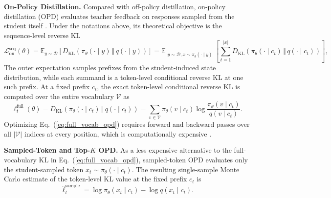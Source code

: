 \documentclass{article} %
\begin{document}
\noindent\textbf{On-Policy Distillation.}
Compared with off-policy distillation, on-policy distillation (OPD) evaluates teacher feedback on responses sampled from the student itself \citep{gkd, gu2024minillm}. Under the notations above, its theoretical objective is the sequence-level reverse KL
\begin{equation}
    \mathcal{L}^{\mathrm{seq}}_{\mathrm{on}}(\theta)
    = \mathbb{E}_{y\sim\mathcal{D}}
    \left[
      D_{\mathrm{KL}}\!\left(
        \pi_\theta(\cdot\mid y)\,\Vert\,q(\cdot\mid y)
      \right)
    \right] 
    = \mathbb{E}_{\substack{y\sim\mathcal{D}, x\sim\pi_\theta(\cdot\mid y)}}
    \left[
      \sum_{t=1}^{|x|} D_{\mathrm{KL}}\!\left(
        \pi_\theta(\cdot\mid c_t)\,\Vert\,q(\cdot\mid c_t)
      \right)
    \right],
    \label{eq:on_policy_kd}
\end{equation}
The outer expectation samples prefixes from the student-induced state distribution, while each summand is a token-level conditional reverse KL at one such prefix. 
At a fixed prefix $c_t$, the exact token-level conditional reverse KL is computed over the entire vocabulary $\mathcal{V}$ as
\begin{equation}
    \ell^{\mathrm{full}}_t(\theta) 
    = D_{\mathrm{KL}}\!\left(
      \pi_\theta(\cdot\mid c_t)\,\Vert\,q(\cdot\mid c_t)
      \right) 
    = \sum_{v\in\mathcal{V}}\pi_\theta(v\mid c_t) \log\frac{\pi_\theta(v\mid c_t)}{q(v\mid c_t)}.
    \label{eq:full_vocab_opd}
\end{equation}
Optimizing Eq.~(\ref{eq:full_vocab_opd}) requires forward and backward passes over all $|\mathcal{V}|$ indices at every position, which is computationally expensive \citep{li2026rethinking, oh2026klforkl}.

\noindent\textbf{Sampled-Token and Top-$K$ OPD.}
As a less expensive alternative to the full-vocabulary KL in Eq.~(\ref{eq:full_vocab_opd}), sampled-token OPD evaluates only the student-sampled token $x_t\sim\pi_\theta(\cdot\mid c_t)$. The resulting single-sample Monte Carlo estimate of the token-level KL value at the fixed prefix $c_t$ is
\begin{equation}
    \widehat{\ell}^{\mathrm{sample}}_t
    =\log \pi_\theta(x_t\mid c_t)-\log q(x_t\mid c_t).
    \label{eq:sampled_token_opd}
\end{equation}
\end{document}
